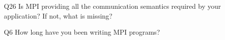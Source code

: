 \begin{description}%
\item{Q26} Is MPI providing all the communication semantics required by your application? If not, what is missing?%
\item{Q6} How long have you been writing MPI programs?%
\end{description}%
